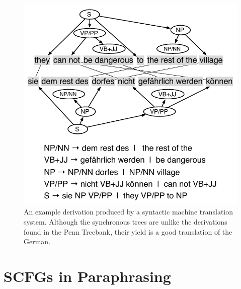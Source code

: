 \documentclass[11pt]{article}
\begin{document}
\begin{figure}[t]
\begin{center}
\includegraphics[width=0.99\linewidth]{figures/example_translation.pdf}
\end{center}
\caption{An example derivation produced by a syntactic machine translation system.  Although the synchronous trees are unlike the derivations found in the Penn Treebank, their yield is a good translation of the German.}
\label{example_translation}
\end{figure}


\section{SCFGs in Paraphrasing} \label{acquisition}
\end{document}

